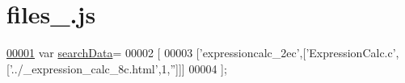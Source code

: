\hypertarget{files__0_8js_source}{\section{files\+\_.\+js}
\label{files__0_8js_source}
}

\begin{DoxyCode}
\hypertarget{files__0_8js_source_l00001}{}\hyperlink{files__0_8js_ad01a7523f103d6242ef9b0451861231e}{00001} var \hyperlink{files__0_8js_ad01a7523f103d6242ef9b0451861231e}{searchData}=
00002 [
00003   [\textcolor{stringliteral}{'expressioncalc\_2ec'},[\textcolor{stringliteral}{'ExpressionCalc.c'},[\textcolor{stringliteral}{'../\_expression\_calc\_8c.html'},1,\textcolor{stringliteral}{''}]]]
00004 ];
\end{DoxyCode}

